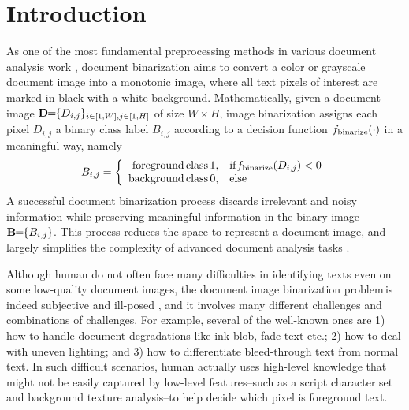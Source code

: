 \documentclass[onecolumn,11pt,draftcls,journal]{IEEEtran}
\def \dibp{the document image binarization problem\,}
\newcommand{\im}[1]{{\bf{#1}}}
\begin{document}
\IEEEpeerreviewmaketitle
\section{Introduction}
As one of the most fundamental preprocessing methods in various document analysis work \cite{DIBCO2009,DIBCO2010,DIBCO2011,DIBCO2012,DIBCO2013,DIBCO2014, Su2013, Combined2014, Howe2013,6065466}, document binarization aims to convert a color or grayscale document image into a monotonic image, where all text pixels of interest are marked in black with a white background. Mathematically, given a document image $\im{D}\!\!=\!\!\{D_{i,j}\}_{i\in[1,W], j\in[1,H]}$ of size $W\!\!\times\!\!H$, image binarization assigns each pixel $D_{i,j}$ a binary class label $B_{i,j}$ according to a decision function $f_{\rm{binarize}}(\cdot)$ in a meaningful way, namely
\begin{equation}
B_{i,j}=\left\{
\begin{array}{r@{}cl}
{\rm{foreground\,class\,}} 1 ,&&{\rm{if}}f_{\rm{binarize}}(D_{i,j}) < 0\\
{ \rm{background\,class\,}} 0 ,&&{\rm{else}} 
\end{array}
\right.
\label{eq.bin}
\end{equation}
A successful document binarization process discards irrelevant and noisy information while preserving meaningful information in the binary image $\im{B}\!\!=\!\!\{B_{i,j}\}$. This process reduces the space to represent a document image, and largely simplifies the complexity of advanced document analysis tasks \cite{Howe2011}.

Although human do not often face many difficulties in identifying texts even on some low-quality document images,  \dibp is indeed subjective and ill-posed \cite{Howe2011}, and it involves many different challenges and combinations of challenges. For example, several of the well-known ones are 1) how to handle document degradations like ink blob, fade text etc.; 2) how to deal with uneven lighting; and 3) how to differentiate bleed-through text from normal text. In such difficult scenarios, human actually uses high-level knowledge that might not be easily captured by low-level features--such as a script character set and background texture analysis--to help decide which pixel is foreground text. 
\end{document}
